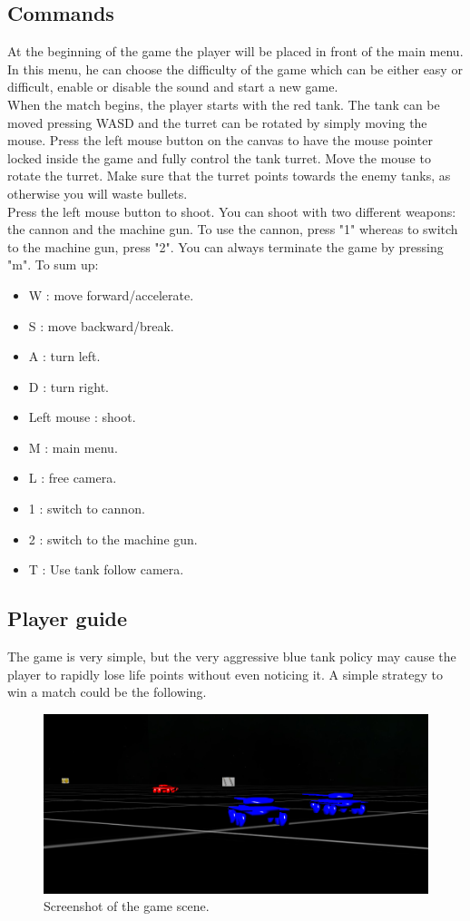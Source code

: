 \documentclass[14pt]{article}
\begin{document}
\subsection{Commands}
At the beginning of the game the player will be placed in front of the main menu. In this menu, he can choose the difficulty of the game which can be either easy or difficult, enable or disable the sound and start a new game. \\
When the match begins, the player starts with the red tank. The tank can be moved pressing WASD and the turret can be rotated by simply moving the mouse. Press the left mouse button on the canvas to have the mouse pointer locked inside the game and fully control the tank turret. Move the mouse to rotate the turret. Make sure that the turret points towards the enemy tanks, as otherwise you will waste bullets.\\
Press the left mouse button to shoot. You can shoot with two different weapons: the cannon and the machine gun. To use the cannon, press "1" whereas to switch to the machine gun, press "2". You can always terminate the game by pressing "m".
To sum up:
\begin{itemize}
\item    W : move forward/accelerate.
\item    S : move backward/break.
\item    A : turn left.
\item    D : turn right.
\item    Left mouse : shoot.
\item    M : main menu.
\item    L : free camera.
\item    1 : switch to cannon.
\item    2 : switch to the machine gun.
\item    T : Use tank follow camera.
\end{itemize}
\subsection{Player guide} 
The game is very simple, but the very aggressive blue tank policy may cause the player to rapidly lose life points without even noticing it. A simple strategy to win a match could be the following. \\


\begin{figure}[H]
\includegraphics[width=12cm]{images/game.png}
\caption{Screenshot of the game scene.}
\label{img:machineGun}
\end{figure}
\end{document}
